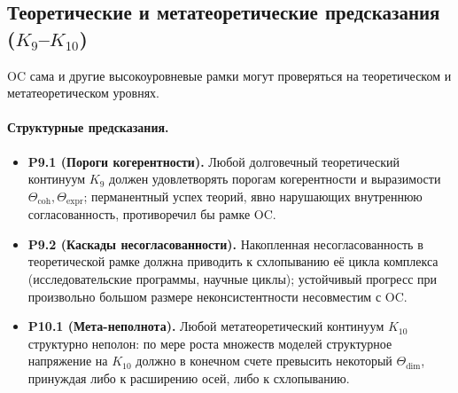 \subsection{Теоретические и метатеоретические предсказания
            (\texorpdfstring{$K_9$}{K9}--\texorpdfstring{$K_{10}$}{K10})}

OC сама и другие высокоуровневые рамки могут проверяться на теоретическом и
метатеоретическом уровнях.

\paragraph{Структурные предсказания.}
\begin{itemize}
  \item \textbf{P9.1 (Пороги когерентности).}
        Любой долговечный теоретический континуум \(K_9\) должен удовлетворять
        порогам когерентности и выразимости
        \(\Theta_{\mathrm{coh}}, \Theta_{\mathrm{expr}}\); перманентный успех
        теорий, явно нарушающих внутреннюю согласованность, противоречил бы
        рамке OC.
  \item \textbf{P9.2 (Каскады несогласованности).}
        Накопленная несогласованность в теоретической рамке должна приводить к
        схлопыванию её цикла комплекса (исследовательские программы,
        научные циклы); устойчивый прогресс при произвольно большом размере
        неконсистентности несовместим с OC.
  \item \textbf{P10.1 (Мета-неполнота).}
        Любой метатеоретический континуум \(K_{10}\) структурно неполон:
        по мере роста множеств моделей структурное напряжение на \(K_{10}\)
        должно в конечном счете превысить некоторый
        \(\Theta_{\mathrm{dim}}\), принуждая либо к расширению осей, либо
        к схлопыванию.
\end{itemize}

